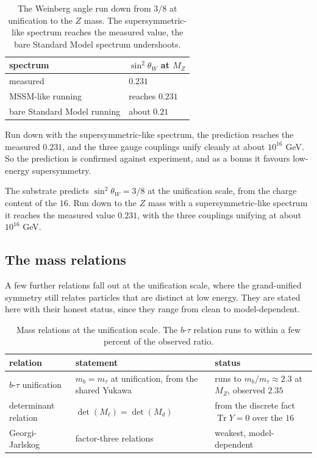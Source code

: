 \begin{table}[ht]
\centering
\begin{tabular}{@{}ll@{}}
\toprule
spectrum & $\sin^2 \theta_W$ at $M_Z$ \\
\midrule
measured & $0.231$ \\
MSSM-like running & reaches $0.231$ \\
bare Standard Model running & about $0.21$ \\
\bottomrule
\end{tabular}
\caption{The Weinberg angle run down from $3/8$ at unification to the $Z$ mass. The supersymmetric-like spectrum reaches the measured value, the bare Standard Model spectrum undershoots.}
\label{tab:weinberg}
\end{table}

Run down with the supersymmetric-like spectrum, the prediction reaches the measured $0.231$, and the three gauge couplings unify cleanly at about $10^{16}$ GeV. So the prediction is confirmed against experiment, and as a bonus it favours low-energy supersymmetry.

\begin{result}
The substrate predicts $\sin^2 \theta_W = 3/8$ at the unification scale, from the charge content of the $16$. Run down to the $Z$ mass with a supersymmetric-like spectrum it reaches the measured value $0.231$, with the three couplings unifying at about $10^{16}$ GeV.
\end{result}

\subsection{The mass relations}

A few further relations fall out at the unification scale, where the grand-unified symmetry still relates particles that are distinct at low energy. They are stated here with their honest status, since they range from clean to model-dependent.

\begin{table}[ht]
\centering
\begin{tabular}{@{}lll@{}}
\toprule
relation & statement & status \\
\midrule
$b$-$\tau$ unification & $m_b = m_\tau$ at unification, from the shared Yukawa & runs to $m_b/m_\tau \approx 2.3$ at $M_Z$, observed $2.35$ \\
determinant relation & $\det(M_{\ell}) = \det(M_d)$ & from the discrete fact $\operatorname{Tr} Y = 0$ over the $16$ \\
Georgi-Jarlskog & factor-three relations & weakest, model-dependent \\
\bottomrule
\end{tabular}
\caption{Mass relations at the unification scale. The $b$-$\tau$ relation runs to within a few percent of the observed ratio.}
\label{tab:mass-relations}
\end{table}

